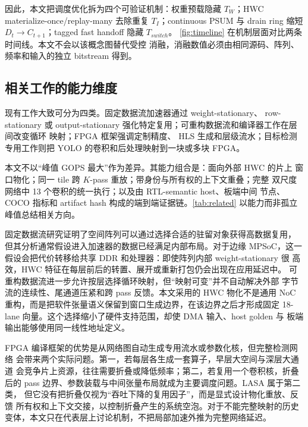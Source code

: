 因此，本文把调度优化拆为四个可验证机制：权重预载隐藏 $T_W$；HWC
materialize-once/replay-many 去除重复 $T_I$；continuous PSUM 与 drain ring
缩短 $D_t\rightarrow C_{t+1}$；tagged fast handoff 隐藏 $T_{switch}$。
\cref{fig:timeline} 在机制层面对比两条时间线。本文不会以该概念图替代受控
消融，消融数值必须由相同源码、阵列、频率和输入的独立 bitstream 得到。



\subsection{相关工作的能力维度}

现有工作大致可分为四类。固定数据流加速器通过 weight-stationary、
row-stationary 或 output-stationary 强化特定复用\cite{chen2016eyeriss,
jouppi2017tpu,sze2017efficient}；可重构数据流和编译器工作在层间改变循环
映射\cite{maeri2018,eyerissv2,simba2019,nvdla2018}；FPGA 框架强调定制精度、
HLS 生成和层级流水\cite{finn2017,fpgaConvNet2015,dnnweaver2018,
vitisai2022}；目标检测专用工作则把 YOLO 的卷积和后处理映射到一块或多块
FPGA\cite{multicoreyolo2023,tinyyoloaccel2022,yolov3fpga2019,
yolov2fpga2018}。

本文不以“峰值 GOPS 最大”作为差异。其能力组合是：面向外部 HWC 的片上
窗口物化；同一 tile 跨 $K$-pass 重放；带身份与所有权的上下文重叠；完整
双尺度网络中 13 个卷积的统一执行；以及由 RTL-semantic host、板端中间
节点、COCO 指标和 artifact hash 构成的端到端证据链。\cref{tab:related}
以能力而非孤立峰值总结相关方向。

固定数据流研究证明了空间阵列可以通过选择合适的驻留对象获得高数据复用，
但其分析通常假设进入加速器的数据已经满足内部布局。对于边缘 MPSoC，这一
假设会把代价转移给共享 DDR 和处理器：即使阵列内部 weight-stationary 很
高效，HWC 特征在每层前后的转置、展开或重新打包仍会出现在应用延迟中。
可重构数据流进一步允许按层选择循环映射，但“映射可变”并不自动解决外部
字节流的连续性、尾通道压紧和跨 pass 反馈。本文采用的 HWC 物化不是通用
NoC 重构，而是把软件张量语义保留到窗口生成边界，在该边界之后才形成固定
18-lane 向量。这个选择缩小了硬件支持范围，却使 DMA 输入、host golden 与
板端输出能够使用同一线性地址定义。

FPGA 编译框架的优势是从网络图自动生成专用流水或参数化核，但完整检测网络
会带来两个实际问题。第一，若每层各生成一套算子，早层大空间与深层大通道
会竞争片上资源，往往需要折叠或降低频率；第二，若复用一个卷积核，折叠后的
pass 边界、参数装载与中间张量布局就成为主要调度问题。LASA 属于第二类，
但它没有把折叠仅视为“吞吐下降的复用因子”，而是显式设计物化重放、反馈
所有权和上下文交接，以控制折叠产生的系统空泡。对于不能完整映射的历史
变体，本文只在代表层上讨论机制，不把局部加速外推为完整网络延迟。

